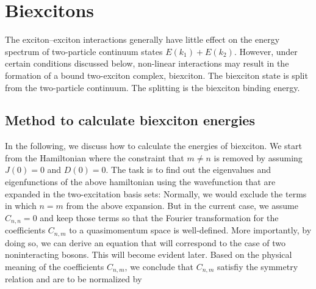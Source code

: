 \section{Biexcitons}
\label{sec:biexciton}
The exciton--exciton interactions generally have little effect on the energy spectrum of two-particle
continuum states $E(k_1) + E(k_2)$. However, under certain conditions discussed below, non-linear
interactions may result in the formation of a bound two-exciton
complex, biexciton. The biexciton state is split from the
two-particle continuum. The splitting is the biexciton binding energy. 

\subsection{Method to calculate biexciton energies}
\label{subsec:biexcitonEnergy}
In the following, we discuss how to calculate the energies of biexciton. We start from the Hamiltonian
where the constraint that $m\neq n$ is removed by assuming $J(0) = 0$ and $D(0) = 0$. The task is to find  out the 
eigenvalues and eigenfunctions of the above hamiltonian using the wavefunction that are expanded in the
 two-excitation basis sets:
Normally, we would exclude the terms in which $n = m$ from the above expansion. But in the current case, we assume
 $C_{n,n}=0$ and keep those terms so that the Fourier transformation for the coefficients $C_{n, m}$ to a
 quasimomentum space
 is well-defined. More importantly, by doing so, we can derive an equation that will correspond to the case of two
 noninteracting bosons. This will become evident later. Based on the physical meaning of the coefficients $C_{n,m}$,
 we conclude that $C_{n,m}$ satisfiy the symmetry relation
and are to be normalized by

